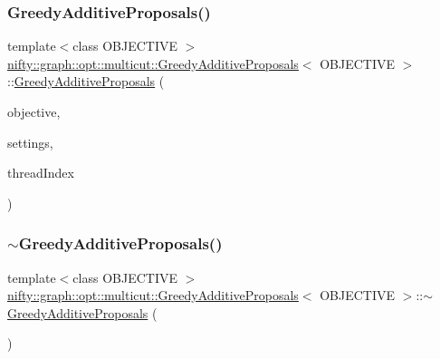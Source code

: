 \subsubsection{\texorpdfstring{Greedy\+Additive\+Proposals()}{GreedyAdditiveProposals()}}
{\footnotesize\ttfamily template$<$class O\+B\+J\+E\+C\+T\+I\+VE $>$ \\
\hyperlink{classnifty_1_1graph_1_1opt_1_1multicut_1_1GreedyAdditiveProposals}{nifty\+::graph\+::opt\+::multicut\+::\+Greedy\+Additive\+Proposals}$<$ O\+B\+J\+E\+C\+T\+I\+VE $>$\+::\hyperlink{classnifty_1_1graph_1_1opt_1_1multicut_1_1GreedyAdditiveProposals}{Greedy\+Additive\+Proposals} (\begin{DoxyParamCaption}\item[{const \hyperlink{classnifty_1_1graph_1_1opt_1_1multicut_1_1GreedyAdditiveProposals_a8b28464e490d224a3626680692ac2170}{Objective\+Type} \&}]{objective,  }\item[{const \hyperlink{structnifty_1_1graph_1_1opt_1_1multicut_1_1GreedyAdditiveProposals_1_1SettingsType}{Settings\+Type} \&}]{settings,  }\item[{const size\+\_\+t}]{thread\+Index }\end{DoxyParamCaption})\hspace{0.3cm}{\ttfamily [inline]}}

\mbox{\label{classnifty_1_1graph_1_1opt_1_1multicut_1_1GreedyAdditiveProposals_a182df5d93866be9a4d6f19f6c6de92c9}} 
\subsubsection{\texorpdfstring{$\sim$\+Greedy\+Additive\+Proposals()}{~GreedyAdditiveProposals()}}
{\footnotesize\ttfamily template$<$class O\+B\+J\+E\+C\+T\+I\+VE $>$ \\
\hyperlink{classnifty_1_1graph_1_1opt_1_1multicut_1_1GreedyAdditiveProposals}{nifty\+::graph\+::opt\+::multicut\+::\+Greedy\+Additive\+Proposals}$<$ O\+B\+J\+E\+C\+T\+I\+VE $>$\+::$\sim$\hyperlink{classnifty_1_1graph_1_1opt_1_1multicut_1_1GreedyAdditiveProposals}{Greedy\+Additive\+Proposals} (\begin{DoxyParamCaption}{ }\end{DoxyParamCaption})\hspace{0.3cm}{\ttfamily [inline]}}




